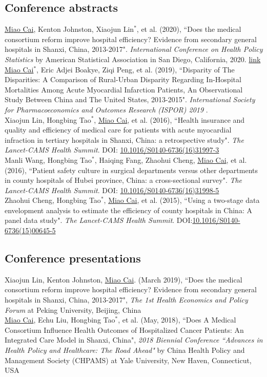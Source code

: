 \documentclass[11pt, a4paper]{article}
\newcommand{\years}[1]{\marginnote{\scriptsize #1}}
\begin{document}
\subsection*{Conference abstracts}
\noindent
\years{2020}\underline{Miao Cai}, Kenton Johnston, Xiaojun Lin$^\ast$, et al. (2020), ``Does the medical consortium reform improve hospital efficiency? Evidence from secondary general hospitals in Shanxi, China, 2013-2017". \emph{International Conference on Health Policy Statistics} by American Statistical Association in San Diego, California, 2020. \href{https://ww2.amstat.org/meetings/ichps/2020/onlineprogram/AbstractDetails.cfm?AbstractID=306703}{link}\\
\years{2019}\underline{Miao Cai$^\ast$}, Eric Adjei Boakye, Ziqi Peng, et al. (2019), ``Disparity of The Disparities: A Comparison of Rural-Urban Disparity Regarding In-Hospital Mortalities Among Acute Myocardial Infarction Patients, An Observational Study Between China and The United States, 2013-2015". \emph{International Society for Pharmacoeconomics and Outcomes Research (ISPOR) 2019 }. \\
\years{2016}Xiaojun Lin, Hongbing Tao$^\ast$, \underline{Miao Cai}, et al. (2016), ``Health insurance and quality and efficiency of medical care for patients with acute myocardial infraction in tertiary hospitals in Shanxi, China: a retrospective study". \emph{The Lancet-CAMS Health Summit}. DOI: \href{https://doi.org/10.1016/S0140-6736(16)31997-3}{10.1016/S0140-6736(16)31997-3}\\
\years{2016}Manli Wang, Hongbing Tao$^\ast$, Haiqing Fang, Zhaohui Cheng, \underline{Miao Cai}, et al. (2016), ``Patient safety culture in surgical departments versus other departments in county hospitals of Hubei province, China: a cross-sectional survey". \emph{The Lancet-CAMS Health Summit}. DOI: \href{https://doi.org/10.1016/S0140-6736(16)31998-5}{10.1016/S0140-6736(16)31998-5}\\
\years{2015}Zhaohui Cheng, Hongbing Tao$^\ast$, \underline{Miao Cai}, et al.  (2015), ``Using a two-stage data envelopment analysis to estimate the efficiency of county hospitals in China: A panel data study". \emph{The Lancet-CAMS Health Summit}. DOI:\href{https://doi.org/10.1016/S0140-6736(15)00645-5}{10.1016/S0140-6736(15)00645-5} 

\subsection*{Conference presentations}
\noindent
\years{2019}Xiaojun Lin, Kenton Johnston, \underline{Miao Cai}. (March 2019), ``Does the medical consortium reform improve hospital efficiency? Evidence from secondary general hospitals in Shanxi, China, 2013-2017", \emph{The 1st Health Economics and Policy Forum} at Peking University, Beijing, China\\
\years{2018}\underline{Miao Cai}, Echu Liu, Hongbing Tao$^\ast$, et al. (May, 2018), ``Does A Medical Consortium Influence Health Outcomes of Hospitalized Cancer Patients: An Integrated Care Model in Shanxi, China", \emph{2018 Biennial Conference ``Advances in Health Policy and Healthcare: The Road Ahead"} by China Health Policy and Management Society (CHPAMS) at Yale University, New Haven, Connecticut, USA
\end{document}
